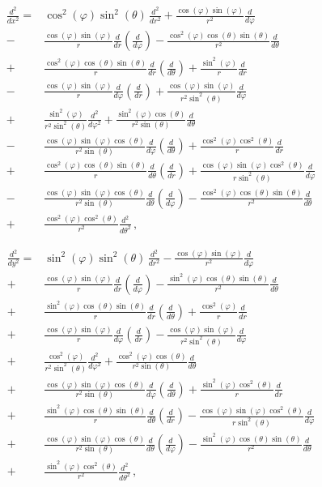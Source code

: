 \documentclass[12pt,a4paper]{article}
\newcommand{\ddx}[1]{\frac{d^2{#1}}{dx^2}}
\newcommand{\ddy}[1]{\frac{d^2{#1}}{dy^2}}
\newcommand{\dr}[1]{\frac{d{#1}}{dr}}
\newcommand{\ddr}[1]{\frac{d^2{#1}}{dr^2}}
\newcommand{\dphi}[1]{\frac{d{#1}}{d\varphi}}
\newcommand{\ddphi}[1]{\frac{d^2{#1}}{d\varphi^2}}
\newcommand{\dt}[1]{\frac{d{#1}}{d\theta}}
\newcommand{\ddt}[1]{\frac{d^2{#1}}{d\theta^2}}
\newcommand{\cphi}{\cos(\varphi)}
\newcommand{\ccphi}{\cos^2(\varphi)}
\newcommand{\sphi}{\sin(\varphi)}
\newcommand{\ssphi}{\sin^2(\varphi)}
\newcommand{\ct}{\cos(\theta)}
\newcommand{\cct}{\cos^2(\theta)}
\newcommand{\st}{\sin(\theta)}
\newcommand{\sst}{\sin^2(\theta)}
\begin{document}
\begin{equation}\label{eq:d2x2}
\begin{split}
\ddx{} =& \ccphi\sst\,\ddr{} + \frac{\cphi\sphi}{r^2}\dphi{} \\
     -& \frac{\cphi\sphi}{r}\dr{}\left(\dphi{}\right) - \frac{\ccphi\ct\st}{r^2}\dt{} \\
     +& \frac{\ccphi\ct\st}{r} \dr{}\left(\dt{}\right) + \frac{\ssphi}{r}\dr{} \\
     -& \frac{\cphi\sphi}{r}\dphi{}\left(\dr{}\right) + \frac{\cphi\sphi}{r^2\sst}\dphi{} \\
     +& \frac{\ssphi}{r^2\sst}\ddphi{} + \frac{\ssphi\ct}{r^2\st}\dt{} \\
     -& \frac{\cphi\sphi\ct}{r^2\st} \dphi{}\left(\dt{}\right) + \frac{\ccphi\cct}{r}\dr{} \\
     +& \frac{\ccphi\ct\st}{r}\dt{}\left(\dr{}\right) + \frac{\cphi\sphi\cct}{r\sst}\dphi{} \\
     -& \frac{\cphi\sphi\ct}{r^2\st} \dt{}\left(\dphi{}\right) - \frac{\ccphi\ct\st}{r^2}\dt{} \\
     +& \frac{\ccphi\cct}{r^2}\ddt{}\,,
\end{split}
\end{equation}

\begin{equation}\label{eq:d2y2}
\begin{split}
\ddy{} =& \ssphi\sst\,\ddr{} - \frac{\cphi\sphi}{r^2}\dphi{} \\
     +& \frac{\cphi\sphi}{r}\dr{}\left(\dphi{}\right) - \frac{\ssphi\ct\st}{r^2}\dt{} \\
     +& \frac{\ssphi\ct\st}{r} \dr{}\left(\dt{}\right) + \frac{\ccphi}{r}\dr{} \\
     +& \frac{\cphi\sphi}{r}\dphi{}\left(\dr{}\right) - \frac{\cphi\sphi}{r^2\sst}\dphi{} \\
     +& \frac{\ccphi}{r^2\sst}\ddphi{} + \frac{\ccphi\ct}{r^2\st}\dt{} \\
     +& \frac{\cphi\sphi\ct}{r^2\st} \dphi{}\left(\dt{}\right) + \frac{\ssphi\cct}{r}\dr{} \\
     +& \frac{\ssphi\ct\st}{r}\dt{}\left(\dr{}\right) - \frac{\cphi\sphi\cct}{r\sst}\dphi{} \\
     +& \frac{\cphi\sphi\ct}{r^2\st} \dt{}\left(\dphi{}\right) - \frac{\ssphi\ct\st}{r^2}\dt{} \\
     +& \frac{\ssphi\cct}{r^2}\ddt{}\,,
\end{split}
\end{equation}
\end{document}
